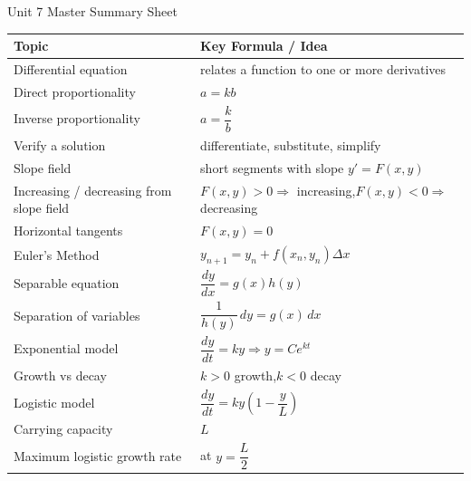 \documentclass[11pt]{article}
\begin{document}
\begin{summarybox}{Unit 7 Master Summary Sheet}
\renewcommand{\arraystretch}{1.35}
\begin{tabularx}{\textwidth}{@{}p{}X@{}}
\toprule
\textbf{Topic} & \textbf{Key Formula / Idea} \\
\midrule
Differential equation & relates a function to one or more derivatives \\

Direct proportionality & \(a=kb\) \\

Inverse proportionality & \(a=\dfrac{k}{b}\) \\

Verify a solution & differentiate, substitute, simplify \\

Slope field & short segments with slope \(y'=F(x,y)\) \\

Increasing / decreasing from slope field & \(F(x,y)>0\Rightarrow\) increasing,\quad \(F(x,y)<0\Rightarrow\) decreasing \\

Horizontal tangents & \(F(x,y)=0\) \\

Euler’s Method & \(y_{n+1}=y_n+f(x_n,y_n)\Delta x\) \\

Separable equation & \(\dfrac{dy}{dx}=g(x)h(y)\) \\

Separation of variables & \(\dfrac{1}{h(y)}\,dy=g(x)\,dx\) \\

Exponential model & \(\dfrac{dy}{dt}=ky\Rightarrow y=Ce^{kt}\) \\

Growth vs decay & \(k>0\) growth,\quad \(k<0\) decay \\

Logistic model & \(\dfrac{dy}{dt}=ky\left(1-\dfrac{y}{L}\right)\) \\

Carrying capacity & \(L\) \\

Maximum logistic growth rate & at \(y=\dfrac{L}{2}\) \\
\bottomrule
\end{tabularx}
\end{summarybox}

\vspace{1em}
\end{document}
